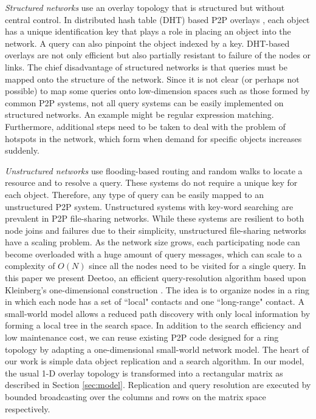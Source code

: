 \documentclass[conference]{IEEEtran}
\begin{document}
\emph{Structured networks} use an overlay topology that is
structured but without central control.
In distributed hash table (DHT) based P2P overlays
\cite{is:Chord,sr:CAN,bz:Tapestry,pr:Symphony}, 
each object has a unique identification 
key that plays a role in placing an object into the network. 
A query can also pinpoint the object indexed by 
a key. DHT-based overlays are not only efficient but also partially 
resistant to failure of the nodes or links. 
The chief disadvantage of structured networks is that queries must be
mapped onto the structure of the network.  Since it is not clear (or
perhaps not possible) to map some queries onto low-dimension spaces
such as those formed by common P2P systems, not all query systems can
be easily implemented on structured networks.  An example might be
regular expression matching.  Furthermore, additional steps need
to be taken to deal with the problem of hotspots in the network, 
which form when demand for specific objects increases suddenly.

\emph{Unstructured networks} %
use flooding-based routing and random walks to locate a resource and to
resolve a query. These systems
do not require a unique key for each object.
Therefore, any type of query can be easily mapped to an
unstructured P2P system.
Unstructured systems with key-word searching are prevalent in P2P
file-sharing networks. While these systems are resilient to both node
joins and failures due to their simplicity, unstructured
file-sharing networks have a scaling problem. As the network size grows,
each participating node can become overloaded with a huge amount of
query messages, which can scale to a complexity of  $O(N)$
since all the nodes need to be visited for a single query. 
\fi
In this paper we present Deetoo, an efficient query-resolution 
algorithm based upon Kleinberg's one-dimensional construction
\cite{jk:Algorithmic}. The idea is to organize nodes in a ring in which 
each node has a set of ``local" contacts and one ``long-range" 
contact. 
A small-world model allows a reduced path discovery 
with only local information by forming a local tree in the search space. 
In addition to the search efficiency and low maintenance cost, 
we can reuse existing P2P code designed for a ring topology by adapting 
a one-dimensional small-world network model.
The heart of our work is simple data object replication and a search 
algorithm. In our model, the usual 1-D
overlay topology is transformed into a rectangular 
matrix as described in Section \ref{sec:model}.  Replication and 
query resolution are executed by bounded broadcasting over the 
columns and rows on the matrix space respectively.
\end{document}
